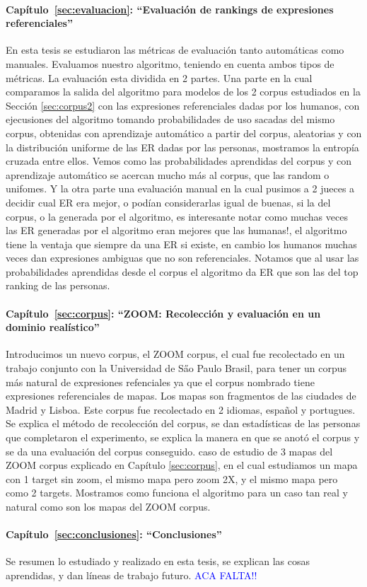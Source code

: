 \paragraph{Cap\'itulo~\ref{sec:evaluacion}: ``Evaluaci\'on de rankings de expresiones referenciales''} En esta tesis se estudiaron las m\'etricas de evaluaci\'on tanto autom\'aticas como manuales. Evaluamos nuestro algoritmo, teniendo en cuenta ambos tipos de m\'etricas. La evaluaci\'on esta dividida en 2 partes. Una parte en la cual comparamos la salida del algoritmo para modelos de los 2 corpus estudiados en la Secci\'on \ref{sec:corpus2} con las expresiones referenciales dadas por los humanos, con ejecusiones del algoritmo tomando probabilidades de uso sacadas del mismo corpus, obtenidas con aprendizaje autom\'atico a partir del corpus, aleatorias y con la distribuci\'on uniforme de las ER dadas por las personas, mostramos la entrop\'ia cruzada entre ellos. Vemos como las probabilidades aprendidas del corpus y con aprendizaje autom\'atico se acercan mucho m\'as al corpus, que las random o unifomes. Y la otra parte una evaluaci\'on manual en la cual pusimos a 2 jueces a decidir cual ER era mejor, o pod\'ian considerarlas igual de buenas, si la del corpus, o la generada por el algoritmo, es interesante notar como muchas veces las ER generadas por el algoritmo eran mejores que las humanas!, el algoritmo tiene la ventaja que siempre da una ER si existe, en cambio los humanos muchas veces dan expresiones ambiguas que no son referenciales. Notamos que al usar las probabilidades aprendidas desde el corpus el algoritmo da ER que son las del top ranking de las personas.

\paragraph{Cap\'itulo~\ref{sec:corpus}: ``ZOOM: Recolecci\'on y evaluaci\'on en un dominio real\'istico''} Introducimos un nuevo corpus, el ZOOM corpus, el cual fue recolectado en un trabajo conjunto con la Universidad de S\H ao Paulo Brasil, para tener un corpus m\'as natural de expresiones refenciales ya que el corpus nombrado tiene expresiones referenciales de mapas. Los mapas son fragmentos de las ciudades de Madrid y Lisboa. Este corpus fue recolectado en 2 idiomas, espa\~nol y portugues. Se explica el m\'etodo de recolecci\'on del corpus, se dan estad\'isticas de las personas que completaron el experimento, se explica la manera en que se anot\'o el corpus y se da una evaluaci\'on del corpus conseguido. caso de estudio de 3 mapas del ZOOM corpus explicado en Cap\'itulo \ref{sec:corpus}, en el cual estudiamos un mapa con 1 target sin zoom, el mismo mapa pero zoom 2X, y el mismo mapa pero como 2 targets. Mostramos como funciona el algoritmo para un caso tan real y natural como son los mapas del ZOOM corpus. 


\paragraph{Cap\'itulo~\ref{sec:conclusiones}: ``Conclusiones''} Se resumen lo estudiado y realizado en esta tesis, se explican las cosas aprendidas, y dan l\'ineas de trabajo futuro. \textcolor{blue}{ACA FALTA!! }

